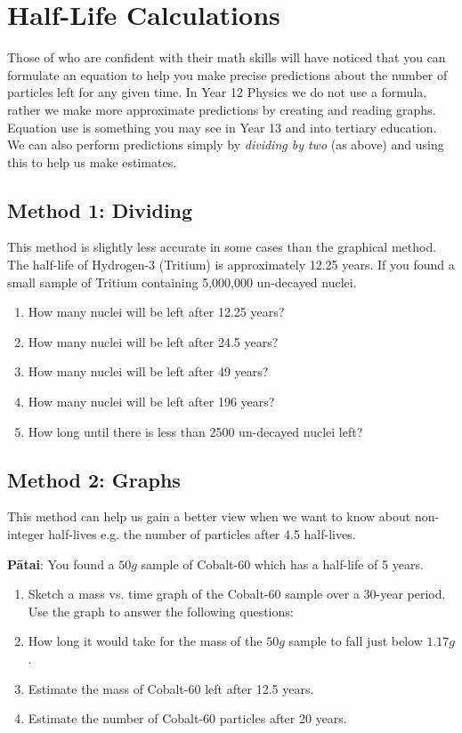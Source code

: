 \documentclass[12pt]{report}
\begin{document}
{\section{Half-Life Calculations}
Those of who are confident with their math skills will have noticed that you can formulate an equation to help you make precise predictions about the number of particles left for any given time. In Year 12 Physics we do not use a formula, rather we make more approximate predictions by creating and reading graphs. Equation use is something you may see in Year 13 and into tertiary education.
We can also perform predictions simply by \textit{dividing by two} (as above) and using this to help us make estimates.

\subsection{Method 1: Dividing}
This method is slightly less accurate in some cases than the graphical method. The half-life of Hydrogen-3 (Tritium) is approximately 12.25 years. If you found a small sample of Tritium containing 5,000,000 un-decayed nuclei.

\begin{enumerate}[itemsep=1cm]
	\item How many nuclei will be left after 12.25 years?
	\item How many nuclei will be left after 24.5 years?
	\item How many nuclei will be left after 49 years?
	\item How many nuclei will be left after 196 years?
	\item How long until there is less than 2500 un-decayed nuclei left?\vspace{1cm}
\end{enumerate}

\subsection{Method 2: Graphs}
This method can help us gain a better view when we want to know about non-integer half-lives e.g. the number of particles after 4.5 half-lives.

\noindent\textbf{Pātai}: You found a $50g$ sample of Cobalt-60 which has a half-life of 5 years.

\begin{enumerate}
    \item Sketch a mass vs. time graph of the Cobalt-60 sample over a 30-year period. Use the graph to answer the following questions:\vspace{10cm}
	\item How long it would take for the mass of the $50g$ sample to fall just below $1.17g$.\vspace{1cm}
	\item Estimate the mass of Cobalt-60 left after 12.5 years.\vspace{1cm}
	\item Estimate the number of Cobalt-60 particles after 20 years.\vspace{1cm}
\end{enumerate}

}
\end{document}
